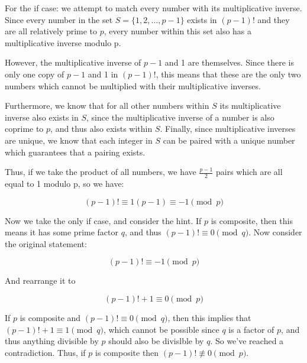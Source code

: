 \documentclass[11pt]{article}
\begin{document}
\begin{solution}
  For the if case: we attempt to match every number with its multiplicative inverse. Since every number in the set $S = \{1, 2, \dots, p-1\}$ exists in $(p - 1)!$ and they are all relatively prime to $p$, every number within this set also has a multiplicative inverse modulo p. 

  However, the multiplicative inverse of $p -1$ and 1 are themselves. Since there is only one copy of $p - 1$ and 1 in $(p - 1)!$, this means that these are the only two numbers which cannot be multiplied with their multiplicative inverses. 

  Furthermore, we know that for all other numbers within $S$ its multiplicative inverse also exists in $S$, since the multiplicative inverse of a number is also coprime to $p$, and thus also exists within $S$. Finally, since multiplicative inverses are unique, we know that each integer in $S$ can be paired with a unique number which guarantees that a pairing exists. 
  
  Thus, if we take the product of all numbers, we have $\frac{p- 1}{2}$ pairs which are all equal to 1 modulo p, so we have:

  \[ (p - 1)! \equiv 1(p - 1) \equiv -1 \pmod p\]


  
  Now we take the only if case, and consider the hint. If $p$ is composite, then this means it has some prime factor $q$, and thus $(p - 1)! \equiv 0 \pmod q$. Now consider the original statement:

  \[ (p - 1)! \equiv -1 \pmod p\]

  And rearrange it to 

  \[ (p - 1)! +1 \equiv 0 \pmod p\]

  If $p$ is composite and $(p - 1)! \equiv 0 \pmod q$, then this implies that $(p - 1)! +1 \equiv 1  \pmod q$, which cannot be possible since $q$ is a factor of $p$, and thus anything divisible by $p$ should also be divislble by $q$. So we've reached a contradiction. Thus, if $p$ is composite then $(p - 1)! \not \equiv 0 \pmod p$.
  
  

  

\end{solution}
\end{document}
